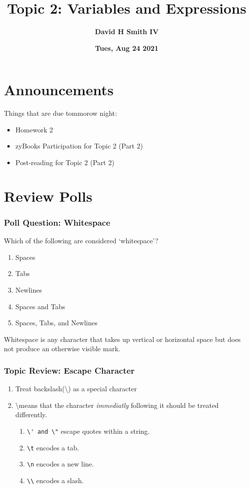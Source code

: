 \documentclass{beamer}
\title{\textbf{Topic 2: Variables and Expressions}}
\author{\textbf{David H Smith IV}}
\institute[\textbf{UIUC}]{\textbf{University of Illinois Urbana-Champaign}}
\date{\textbf{Tues, Aug 24 2021}}
\begin{document}
\frame{\titlepage}

\section{Announcements}

\begin{frame}
  Things that are due tommorow night:
    \begin{itemize}
      \item Homework 2
      \item zyBooks Participation for Topic 2 (Part 2) 
      \item Post-reading for Topic 2 (Part 2)
    \end{itemize}
\end{frame}

\section{Review Polls}

%
%
%
\begin{frame}[fragile]
  \frametitle{Poll Question: Whitespace}
  Which of the following are considered `whitespace'?
  \vfill
  \begin{enumerate}[A]
    \item Spaces
    \item Tabs
    \item Newlines
    \item Spaces and Tabs
    \item Spaces, Tabs, and Newlines
  \end{enumerate}
  \pause
  \vfill
  Whitespace is any character that takes up vertical or horizontal space but does not produce an otherwise visible mark.
\end{frame}

%
%
%
\begin{frame}[fragile]
  \frametitle{Topic Review: Escape Character}
  \begin{enumerate}
    \item Treat backslash(\textbackslash) as a special character
    \item \textbackslash means that the character \textit{immediatly} following it should be treated differently.
      \begin{enumerate}
        \item \lstinline{\' and \"} escape quotes within a string.
        \item \lstinline{\t} encodes a tab.
        \item \lstinline{\n} encodes a new line.
        \item \lstinline{\\} encodes a slash.
      \end{enumerate}
  \end{enumerate}
\end{frame}
\end{document}
